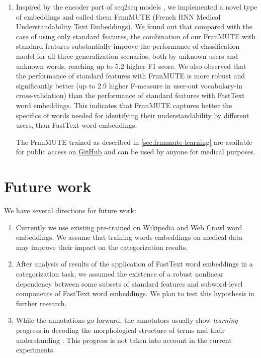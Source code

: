 \begin{enumerate}[listparindent=1.5em]
    \item Inspired by the encoder part of seq2seq models \citep{Sutskever-NIPS2014}, we implemented a novel type of embeddings and called them FrnnMUTE (French RNN Medical Understandability Text Embeddings). We found out that compared with the case of using only standard features, the combination of our FrnnMUTE with standard features substantially improve the performance of classification model for all three generalization scenarios, both by unknown users and unknown words, reaching up to 5.2 higher F1 score. We also observed that the performance of standard features with FrnnMUTE is more robust and significantly better (up to 2.9 higher F-measure in user-out vocabulary-in cross-validation) than the performance of standard features with FastText word embeddings. This indicates that FrnnMUTE captures better the specifics of words needed for identifying their understandability by different users, than FastText word embeddings.
    
    The FrnnMUTE trained as described in \ref{sec:frnnmute-learning} are available for public access on \href{https://github.com/hpylieva/FrnnMUTE}{GitHub} and can be used by anyone for medical purposes.
\end{enumerate}

\section{Future work}
We have several directions for future work:
\begin{enumerate}
    \item Currently we use existing pre-trained on Wikipedia and Web Crawl word embeddings. We assume that training words embeddings on medical data may improve their impact on the categorization results.
    
    \item After analysis of results of the application of FastText word embeddings in a categorization task, we assumed the existence of a robust nonlinear dependency between some subsets of standard features and subword-level components of FastText word embeddings. We plan to test this hypothesis in further research.
    
    \item While the annotations go forward, the annotators usually show {\it learning} progress in decoding the morphological structure of terms and their understanding \citep{Grabar-BIONLP2017}. This progress is not taken into account in the current experiments. 
\end{enumerate}

